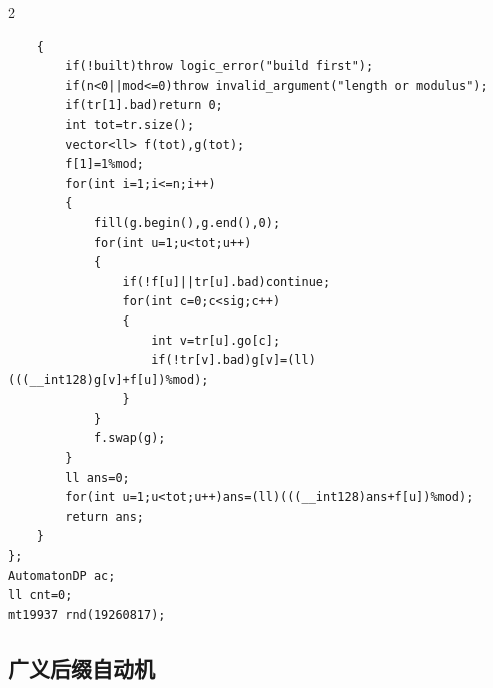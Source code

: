 \documentclass[UTF8,fontset=fandol,a4paper,twoside]{ctexart}
\begin{document}
\begin{multicols}{2}
\begin{lstlisting}
    {
        if(!built)throw logic_error("build first");
        if(n<0||mod<=0)throw invalid_argument("length or modulus");
        if(tr[1].bad)return 0;
        int tot=tr.size();
        vector<ll> f(tot),g(tot);
        f[1]=1%mod;
        for(int i=1;i<=n;i++)
        {
            fill(g.begin(),g.end(),0);
            for(int u=1;u<tot;u++)
            {
                if(!f[u]||tr[u].bad)continue;
                for(int c=0;c<sig;c++)
                {
                    int v=tr[u].go[c];
                    if(!tr[v].bad)g[v]=(ll)(((__int128)g[v]+f[u])%mod);
                }
            }
            f.swap(g);
        }
        ll ans=0;
        for(int u=1;u<tot;u++)ans=(ll)(((__int128)ans+f[u])%mod);
        return ans;
    }
};
AutomatonDP ac;
ll cnt=0;
mt19937 rnd(19260817);
\end{lstlisting}
\subsection{广义后缀自动机}


\end{multicols}
\end{document}
